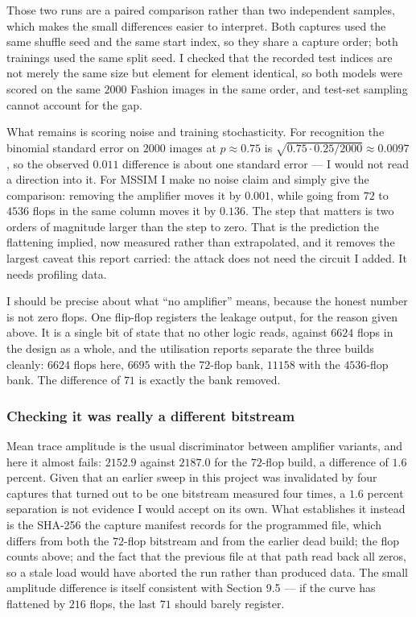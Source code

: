 \documentclass[11pt,a4paper]{article}
\begin{document}
Those two runs are a paired comparison rather than two independent samples, which makes
the small differences easier to interpret. Both captures used the same shuffle seed and
the same start index, so they share a capture order; both trainings used the same split
seed. I checked that the recorded test indices are not merely the same size but element
for element identical, so both models were scored on the same $2000$ Fashion images in the
same order, and test-set sampling cannot account for the gap.

What remains is scoring noise and training stochasticity. For recognition the binomial
standard error on $2000$ images at $p \approx 0.75$ is $\sqrt{0.75 \cdot 0.25 / 2000}
\approx 0.0097$, so the observed $0.011$ difference is about one standard error --- I
would not read a direction into it. For MSSIM I make no noise claim and simply give the
comparison: removing the amplifier moves it by $0.001$, while going from $72$ to $4536$
flops in the same column moves it by $0.136$. The step that matters is two orders of
magnitude larger than the step to zero. That is the prediction the flattening implied, now measured rather than extrapolated,
and it removes the largest caveat this report carried: the attack does not need the
circuit I added. It needs profiling data.

I should be precise about what ``no amplifier'' means, because the honest number is not
zero flops. One flip-flop registers the leakage output, for the reason given above. It is
a single bit of state that no other logic reads, against $6624$ flops in the design as a
whole, and the utilisation reports separate the three builds cleanly: $6624$ flops here,
$6695$ with the $72$-flop bank, $11158$ with the $4536$-flop bank. The difference of $71$
is exactly the bank removed.

\subsubsection*{Checking it was really a different bitstream}

Mean trace amplitude is the usual discriminator between amplifier variants, and here it
almost fails: $2152.9$ against $2187.0$ for the $72$-flop build, a difference of $1.6$
percent. Given that an earlier sweep in this project was invalidated by four captures that
turned out to be one bitstream measured four times, a $1.6$ percent separation is not
evidence I would accept on its own. What establishes it instead is the SHA-256 the capture
manifest records for the programmed file, which differs from both the $72$-flop bitstream
and from the earlier dead build; the flop counts above; and the fact that the previous file
at that path read back all zeros, so a stale load would have aborted the run rather than
produced data. The small amplitude difference is itself consistent with Section 9.5 --- if
the curve has flattened by $216$ flops, the last $71$ should barely register.
\end{document}
